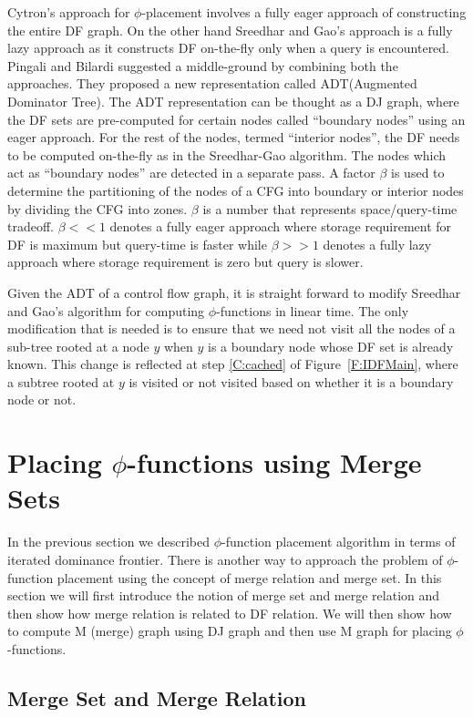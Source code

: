 Cytron's approach for $\phi$-placement involves a fully eager approach of constructing the entire DF graph. On the other hand Sreedhar and Gao's approach is a fully lazy approach as it constructs DF on-the-fly only when a query is encountered.
Pingali and Bilardi \cite{bilardi} suggested a middle-ground by combining both the approaches. They proposed a new representation called ADT(Augmented Dominator Tree). 
The ADT representation can be
thought as a DJ graph, where the DF sets are pre-computed for certain nodes called ``boundary nodes'' using an eager approach. For the rest of the nodes, termed ``interior nodes'', the DF needs to be computed on-the-fly as in the Sreedhar-Gao algorithm. The nodes which act as ``boundary nodes'' are detected in a separate pass. A factor $\beta$ is used to determine the partitioning of the nodes of a CFG into boundary or interior nodes by dividing the CFG into zones. $\beta$ is a number that represents space/query-time tradeoff. $\beta << 1$ denotes a fully eager approach where storage requirement for DF is maximum but query-time is faster while $\beta >> 1$ denotes a fully lazy approach where storage requirement is zero but query is slower. 

Given the ADT of a control flow graph, it is straight forward to 
modify  Sreedhar and Gao's algorithm for computing $\phi$-functions in linear time. The only modification that is needed is to ensure that we need not visit all the nodes of a sub-tree rooted at a node $y$ when $y$ is a boundary node whose DF set is already known. This change is reflected at step \ref{C:cached} of Figure~\ref{F:IDFMain}, where a subtree rooted at $y$ is visited or not visited based on whether it is a boundary node or not.


\section{Placing $\phi$-functions using Merge Sets}

In the previous section we described $\phi$-function placement algorithm in terms 
of iterated dominance frontier. There is another way to approach the problem
of $\phi$-function placement using the concept of merge relation and merge set. In this section
we will first introduce the notion of merge set and merge relation and then show
how merge relation is related to DF relation. We will then show how to compute
M (merge) graph using DJ graph and then use M graph for placing $\phi$-functions.

\subsection{Merge Set and Merge Relation}

